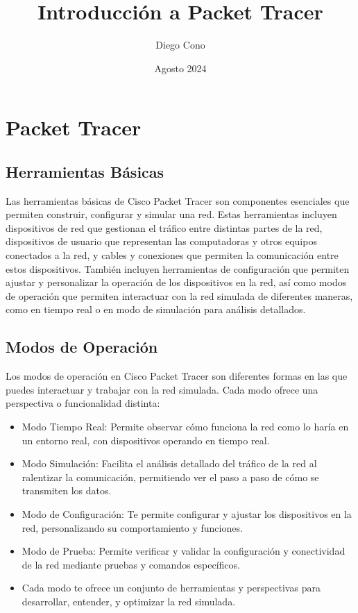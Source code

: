 \documentclass{article}
\title{Introducción a Packet Tracer}
\author{Diego Cono}
\date{Agosto 2024}
\begin{document}
\maketitle

\section{Packet Tracer}
    \subsection{Herramientas Básicas}

        Las herramientas básicas de Cisco Packet Tracer son componentes esenciales que permiten construir, configurar y simular una red. Estas herramientas incluyen dispositivos de red que gestionan el tráfico entre distintas partes de la red, dispositivos de usuario que representan las computadoras y otros equipos conectados a la red, y cables y conexiones que permiten la comunicación entre estos dispositivos. También incluyen herramientas de configuración que permiten ajustar y personalizar la operación de los dispositivos en la red, así como modos de operación que permiten interactuar con la red simulada de diferentes maneras, como en tiempo real o en modo de simulación para análisis detallados.  

    \subsection{Modos de Operación}
        Los modos de operación en Cisco Packet Tracer son diferentes formas en las que puedes interactuar y trabajar con la red simulada. Cada modo ofrece una perspectiva o funcionalidad distinta:
        \begin{itemize}
            \item Modo Tiempo Real: Permite observar cómo funciona la red como lo haría en un entorno real, con dispositivos operando en tiempo real.
            \item Modo Simulación: Facilita el análisis detallado del tráfico de la red al ralentizar la comunicación, permitiendo ver el paso a paso de cómo se transmiten los datos.
            \item Modo de Configuración: Te permite configurar y ajustar los dispositivos en la red, personalizando su comportamiento y funciones.
            \item Modo de Prueba: Permite verificar y validar la configuración y conectividad de la red mediante pruebas y comandos específicos.
            \item Cada modo te ofrece un conjunto de herramientas y perspectivas para desarrollar, entender, y optimizar la red simulada.
        \end{itemize}
        
\end{document}
